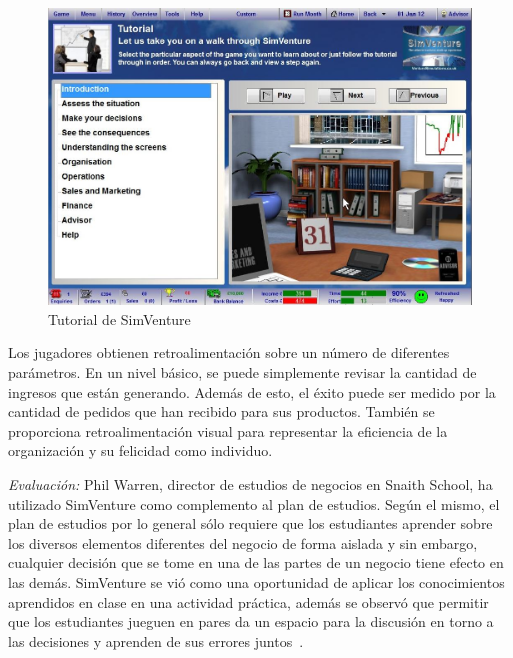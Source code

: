 \begin{figure}[h!]
	\centering 
	\includegraphics[scale=0.5]{tics/images/simventure-tutorial.jpg}
	\caption{Tutorial de SimVenture}
	\label{fig:simventure_tutorial}
\end{figure}

Los jugadores obtienen retroalimentación sobre un número de diferentes
parámetros. En un nivel básico, se puede simplemente revisar la cantidad de
ingresos que están generando. Además de esto, el éxito puede ser medido por la
cantidad de pedidos que han recibido para sus productos. También se proporciona
retroalimentación visual para representar la eficiencia de la organización y su
felicidad como individuo.

\emph{Evaluación: } Phil Warren, director de estudios de negocios en Snaith
School, ha utilizado SimVenture como complemento al plan de estudios. Según el
mismo, el plan de estudios por lo general sólo requiere que los estudiantes
aprender sobre los diversos elementos diferentes del negocio de forma aislada y
sin embargo, cualquier decisión que se tome en una de las partes de un negocio
tiene efecto en las demás. SimVenture se vió como una oportunidad de aplicar los
conocimientos aprendidos en clase en una actividad práctica, además se observó
que permitir que los estudiantes jueguen en pares da un espacio para la
discusión en torno a las decisiones y aprenden de sus errores
juntos~\cite{education:games}.

